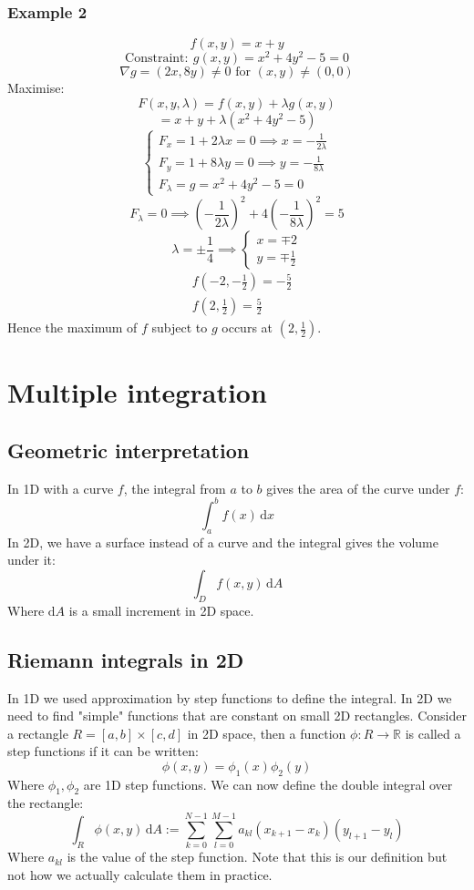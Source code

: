 \documentclass[12pt]{article}
\begin{document}
\subsubsection*{Example 2}
\[f(x,y)=x+y\]
\[\text{Constraint}:\ g(x,y)=x^2+4y^2-5=0\]
\[\nabla g=(2x, 8y)\ne 0\text{ for } (x,y)\ne (0,0)\]
Maximise:
\[F(x,y,\lambda)=f(x,y)+\lambda g(x,y)\]
\[=x+y+\lambda(x^2+4y^2-5)\]
\[\begin{cases}
    F_x=1+2\lambda x=0\implies x=-\frac{1}{2\lambda} \\
    F_y=1+8\lambda y=0\implies y=-\frac{1}{8\lambda} \\
    F_\lambda =g=x^2+4y^2-5=0
\end{cases}\]
\[F_\lambda =0\implies \left(-\frac{1}{2\lambda}\right)^2+4\left(-\frac{1}{8\lambda}\right)^2=5\]
\[\lambda=\pm\frac{1}{4}\implies \begin{cases}
    x= \mp 2 \\
    y=\mp \frac{1}{2}
\end{cases}\]
\begin{align*}
    &f\left(-2,-\frac{1}{2}\right)=-\frac{5}{2} \\
    &f\left(2,\frac{1}{2}\right)=\frac{5}{2}
\end{align*}
Hence the maximum of \(f\) subject to \(g\) occurs at \(\left(2,\frac{1}{2}\right)\).
\section{Multiple integration}
\subsection*{Geometric interpretation}
In 1D with a curve \(f\), the integral from \(a\) to \(b\) gives the area of the curve under \(f\):
\[\int^b_af(x)\,\text{d}x\]
In 2D, we have a surface instead of a curve and the integral gives the volume under it:
\[\int_Df(x,y)\,\text{d}A\]
Where \(\text{d}A\) is a small increment in 2D space.
\subsection*{Riemann integrals in 2D}
In 1D we used approximation by step functions to define the integral. In 2D we need to find "simple" functions that are constant on small 2D rectangles. Consider a rectangle \(R=[a,b]\times[c,d]\) in 2D space, then a function \(\phi:R\to\mathbb{R}\) is called a step functions if it can be written:
\[\phi(x,y)=\phi_1(x)\phi_2(y)\]
Where \(\phi_1,\phi_2\) are 1D step functions. We can now define the double integral over the rectangle:
\[\int_R\phi(x,y)\,\text{d}A:=\sum^{N-1}_{k=0}\sum^{M-1}_{l=0}a_{kl}(x_{k+1}-x_k)(y_{l+1}-y_l)\]
Where \(a_{kl}\) is the value of the step function. Note that this is our definition but not how we actually calculate them in practice.
\end{document}
